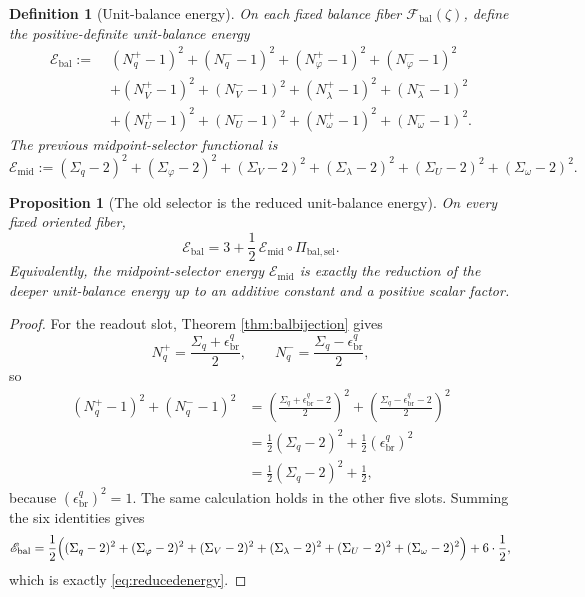 \documentclass[11pt]{article}
\newcommand{\PolRead}{\epsilon_{\mathrm{br}}^{q}}
\newcommand{\SelRead}{\Sigma_{q}}
\newcommand{\SelCov}{\Sigma_{\varphi}}
\newcommand{\SelRelax}{\Sigma_{V}}
\newcommand{\SelWell}{\Sigma_{\lambda}}
\newcommand{\SelEq}{\Sigma_{U}}
\newcommand{\SelScale}{\Sigma_{\omega}}
\newcommand{\SelEnergy}{\mathscr E_{\mathrm{mid}}}
\newcommand{\BalSelMap}{\Pi_{\mathrm{bal,sel}}}
\newcommand{\BalFiberClass}{\mathscr F_{\mathrm{bal}}}
\newcommand{\BalEnergy}{\mathscr E_{\mathrm{bal}}}
\newcommand{\BalReadPlus}{N_{q}^{+}}
\newcommand{\BalReadMinus}{N_{q}^{-}}
\newcommand{\BalCovPlus}{N_{\varphi}^{+}}
\newcommand{\BalCovMinus}{N_{\varphi}^{-}}
\newcommand{\BalRelaxPlus}{N_{V}^{+}}
\newcommand{\BalRelaxMinus}{N_{V}^{-}}
\newcommand{\BalWellPlus}{N_{\lambda}^{+}}
\newcommand{\BalWellMinus}{N_{\lambda}^{-}}
\newcommand{\BalEqPlus}{N_{U}^{+}}
\newcommand{\BalEqMinus}{N_{U}^{-}}
\newcommand{\BalScalePlus}{N_{\omega}^{+}}
\newcommand{\BalScaleMinus}{N_{\omega}^{-}}
\newtheorem{definition}{Definition}
\newtheorem{proposition}{Proposition}
\begin{document}
\begin{definition}[Unit-balance energy]
\label{def:balenergy}
On each fixed balance fiber \(\BalFiberClass(\zeta)\), define the positive-definite unit-balance energy
\begin{align}
\BalEnergy
:=\;&
(\BalReadPlus-1)^{2}+(\BalReadMinus-1)^{2}
+(\BalCovPlus-1)^{2}+(\BalCovMinus-1)^{2}
\nonumber\\
&+(\BalRelaxPlus-1)^{2}+(\BalRelaxMinus-1)^{2}
+(\BalWellPlus-1)^{2}+(\BalWellMinus-1)^{2}
\nonumber\\
&+(\BalEqPlus-1)^{2}+(\BalEqMinus-1)^{2}
+(\BalScalePlus-1)^{2}+(\BalScaleMinus-1)^{2}.
\label{eq:balenergy}
\end{align}
The previous midpoint-selector functional is
\begin{equation}
\SelEnergy
:=
(\SelRead-2)^{2}
+(\SelCov-2)^{2}
+(\SelRelax-2)^{2}
+(\SelWell-2)^{2}
+(\SelEq-2)^{2}
+(\SelScale-2)^{2}.
\label{eq:selenergy}
\end{equation}
\end{definition}

\begin{proposition}[The old selector is the reduced unit-balance energy]
\label{prop:reducedenergy}
On every fixed oriented fiber,
\begin{equation}
\BalEnergy
=
3+\frac12\,\SelEnergy\circ\BalSelMap.
\label{eq:reducedenergy}
\end{equation}
Equivalently, the midpoint-selector energy \(\SelEnergy\) is exactly the reduction of the deeper unit-balance energy up to an additive constant and a positive scalar factor.
\end{proposition}

\begin{proof}
For the readout slot, Theorem \ref{thm:balbijection} gives
\[
\BalReadPlus=\frac{\SelRead+\PolRead}{2},
\qquad
\BalReadMinus=\frac{\SelRead-\PolRead}{2},
\]
so
\begin{align*}
(\BalReadPlus-1)^{2}+(\BalReadMinus-1)^{2}
&=
\left(\frac{\SelRead+\PolRead-2}{2}\right)^{2}
+
\left(\frac{\SelRead-\PolRead-2}{2}\right)^{2}
\\
&=
\frac12(\SelRead-2)^{2}
+\frac12(\PolRead)^{2}
\\
&=
\frac12(\SelRead-2)^{2}+\frac12,
\end{align*}
because \((\PolRead)^{2}=1\). The same calculation holds in the other five slots. Summing the six identities gives
\[
\BalEnergy
=
\frac12\Bigl(
(\SelRead-2)^{2}
+(\SelCov-2)^{2}
+(\SelRelax-2)^{2}
+(\SelWell-2)^{2}
+(\SelEq-2)^{2}
+(\SelScale-2)^{2}
\Bigr)
+6\cdot\frac12,
\]
which is exactly \eqref{eq:reducedenergy}.
\end{proof}
\end{document}
